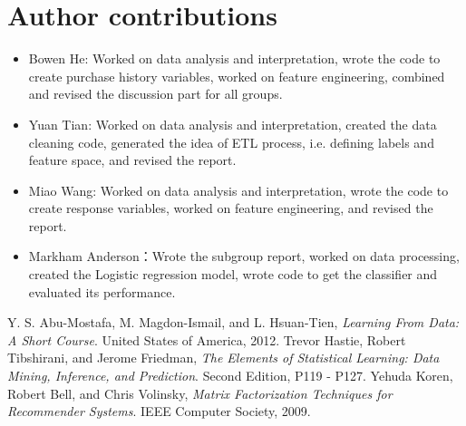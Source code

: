 \documentclass{report}
\begin{document}
\section{Author contributions}
\begin{itemize}
\item Bowen He:  Worked on data analysis and interpretation, wrote the code to create purchase history variables, worked on feature engineering, combined and revised the discussion part for all groups.

\item Yuan Tian:  Worked on data analysis and interpretation, created the data cleaning code, generated the idea of ETL process, i.e. defining labels and feature space, and revised the report.

\item Miao Wang:  Worked on data analysis and interpretation, wrote the code to create response variables, worked on feature engineering, and revised the report.

\item Markham Anderson：Wrote the subgroup report, worked on data processing, created the Logistic regression model, wrote code to get the classifier and evaluated its performance.
\end{itemize}
\begin{thebibliography}{9}

Y. S. Abu-Mostafa, M. Magdon-Ismail, and  L. Hsuan-Tien, \textit{Learning From Data: A Short Course}. United States of America, 2012.
Trevor Hastie, Robert Tibshirani, and  Jerome Friedman, 
\textit{The Elements of Statistical Learning: Data Mining, Inference, and Prediction}. Second Edition, P119 - P127.
Yehuda Koren, Robert Bell, and  Chris Volinsky, 
\textit{Matrix Factorization Techniques for Recommender Systems}. IEEE Computer Society, 2009.

\end{thebibliography}
\end{document}
